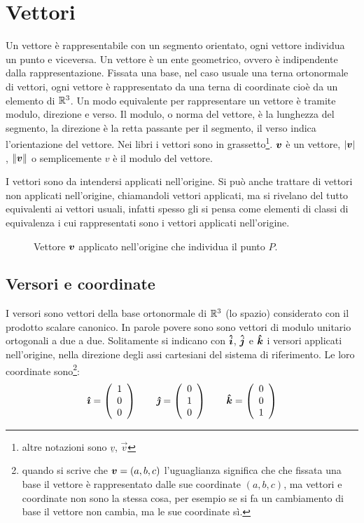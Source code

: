 \chapter{Vettori}
\minitoc
Un vettore è rappresentabile con un segmento orientato, ogni vettore individua un punto e viceversa. Un vettore è un ente geometrico, ovvero è indipendente dalla rappresentazione. Fissata una base, nel caso usuale una terna ortonormale di vettori, ogni vettore è rappresentato da una terna di coordinate cioè da un elemento di $\mathbb{R}^3$. Un modo equivalente per rappresentare un vettore è tramite modulo, direzione e verso. Il modulo, o norma del vettore, è la lunghezza del segmento, la direzione è la retta passante per il segmento, il verso indica l'orientazione del vettore. Nei libri i vettori sono in grassetto\footnote{altre notazioni sono $\underline v$, $\vec{v}$}. $\boldsymbol{v}$ è un vettore, $|\boldsymbol{v}|$, $\left\lVert\boldsymbol{v}\right\rVert$ o semplicemente $v$ è il modulo del vettore.

I vettori sono da intendersi applicati nell'origine. Si può anche trattare di vettori non applicati nell'origine, chiamandoli vettori applicati, ma si rivelano del tutto equivalenti ai vettori usuali, infatti spesso gli si pensa come elementi di classi di equivalenza i cui rappresentati sono i vettori applicati nell'origine.
\begin{figure}[htbp]
  \centering
  
  \caption{Vettore $\boldsymbol{v}$ applicato nell'origine che individua il punto $P$.}
\end{figure}
\section{Versori e coordinate}
I versori sono vettori della base ortonormale di $\mathbb{R}^3$ (lo spazio) considerato con il prodotto scalare canonico. In parole povere sono sono vettori di modulo unitario ortogonali a due a due. Solitamente si indicano con $\boldsymbol{\hat {i}}$, $\boldsymbol{\hat {j}}$ e $\boldsymbol{\hat {k}}$ i versori applicati nell'origine, nella direzione degli assi cartesiani del sistema di riferimento. Le loro coordinate sono\footnote{quando si scrive che $\boldsymbol{v}=(a,b,c)$ l'uguaglianza significa che che fissata una base il vettore è rappresentato dalle sue coordinate $(a,b,c)$, ma vettori e coordinate non sono la stessa cosa, per esempio se si fa un cambiamento di base il vettore non cambia, ma le sue coordinate sì.}:
\[
  \boldsymbol{\hat {\imath}}=\left(\begin{array}{c} 1\\0\\0\\ \end{array}\right)\qquad
  \boldsymbol{\hat {\jmath}}=\left(\begin{array}{c} 0\\1\\0\\ \end{array}\right)\qquad
  \boldsymbol{\hat {k}}=\left(\begin{array}{c} 0\\0\\1\\ \end{array}\right)
\]

